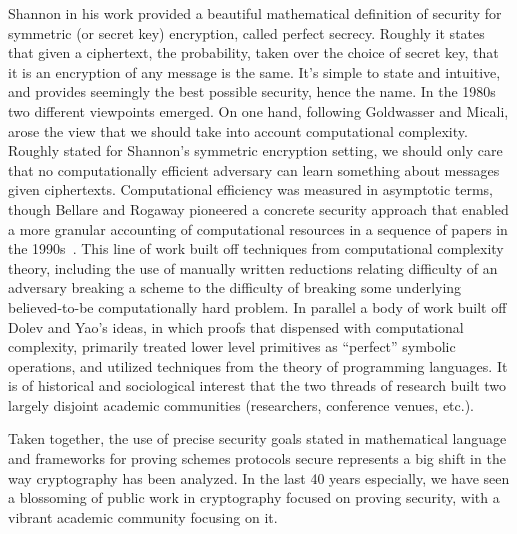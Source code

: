 Shannon in his work provided a beautiful mathematical definition of security for
symmetric (or secret key) encryption, called perfect secrecy. Roughly it states
that given a ciphertext, the probability, taken over the choice of secret key,
that it is an encryption of any message is the same. It's simple to state and
intuitive, and provides seemingly the best possible security, hence the name. In
the 1980s two different viewpoints emerged. On one hand, following Goldwasser
and Micali, arose the view that we should take into account computational
complexity. Roughly stated for Shannon's symmetric encryption setting, we should
only care that no computationally efficient adversary can learn something about
messages given ciphertexts.  Computational efficiency was measured in asymptotic
terms, though Bellare and Rogaway pioneered a concrete security approach that
enabled a more granular accounting of computational resources in a sequence of
papers in the 1990s~\cite{bellare1994security}.  This line of work built off techniques from
computational complexity theory, including the use of manually written
reductions relating difficulty of an adversary breaking a scheme to the
difficulty of breaking some underlying believed-to-be computationally hard
problem.  In parallel a body of work built off Dolev and Yao's ideas, in which
proofs that dispensed with computational complexity, primarily treated lower
level primitives as ``perfect'' symbolic operations, and utilized techniques
from the theory of programming languages. It is of historical and sociological
interest that the two threads of research built two largely disjoint academic communities
(researchers, conference venues, etc.).

Taken together, the use of precise security
goals stated in mathematical language and frameworks for proving schemes
protocols secure represents a big shift in the way cryptography has been
analyzed.
In the last 40 years especially, we have seen a blossoming of public
work in cryptography focused on proving security, with a vibrant academic
community focusing on it. 


